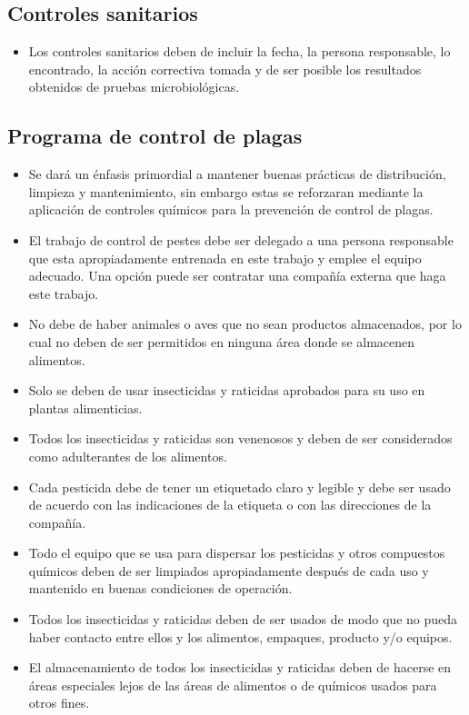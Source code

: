 \subsection{Controles sanitarios}

\begin{itemize}
	\item Los controles sanitarios deben de incluir la fecha, la persona responsable, lo encontrado, la acción correctiva tomada y de ser posible los resultados obtenidos de pruebas microbiológicas.
\end{itemize}

\subsection{Programa de control de plagas}

\begin{itemize}
	\item Se dará un énfasis primordial a mantener buenas prácticas de distribución, limpieza y mantenimiento, sin embargo estas se reforzaran mediante la aplicación de controles químicos para la prevención de control de plagas.
	\item El trabajo de control de pestes debe ser delegado a una persona responsable que esta apropiadamente entrenada en este trabajo y emplee el equipo adecuado. Una opción puede ser contratar una compañía externa que haga este trabajo.
	\item No debe de haber animales o aves que no sean productos almacenados, por lo cual no deben de ser permitidos en ninguna área donde se almacenen alimentos.
	\item Solo se deben de usar insecticidas y raticidas aprobados para su uso en plantas alimenticias.
	\item Todos los insecticidas y raticidas son venenosos y deben de ser considerados como adulterantes de los alimentos.
	\item Cada pesticida debe de tener un etiquetado claro y legible y debe ser usado de acuerdo con las indicaciones de la etiqueta o con las direcciones de la compañía.
	\item Todo el equipo que se usa para dispersar los pesticidas y otros compuestos químicos deben de ser limpiados apropiadamente después de cada uso y mantenido en buenas condiciones de operación.
	\item Todos los insecticidas y raticidas deben de ser usados de modo que no pueda haber contacto entre ellos y los alimentos, empaques, producto y/o equipos.
	\item El almacenamiento de todos los insecticidas y raticidas deben de hacerse en áreas especiales lejos de las áreas de alimentos o de químicos usados para otros fines.
\end{itemize}

